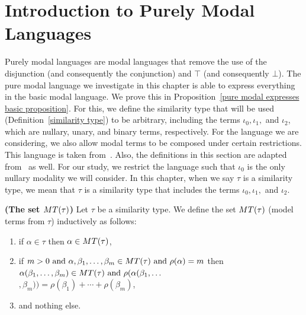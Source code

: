 \section{Introduction to Purely Modal Languages}\label{pure modal languages section}

\par Purely modal languages are modal languages that remove the use of the disjunction (and consequently the conjunction) and $\top$ (and consequently $\bot$). The pure modal language we investigate in this chapter is able to express everything in the basic modal language. We prove this in Proposition~\ref{pure modal expresses basic proposition}. 
For this, we define the similarity type that will be used (Definition~\ref{similarity type}) to be arbitrary, including the terms $\iota_0, \iota_1,$ and $\iota_2$, which are nullary, unary, and binary terms, respectively. For the language we are considering, we also allow modal terms to be composed under certain restrictions. This language is taken from~\cite{goranko2006elementary}. Also, the definitions in this section are adapted from~\cite{goranko2006elementary} as well. For our study, we restrict the language such that $\iota_0$ is the only nullary modality we will consider. In this chapter, when we say $\tau$ is a similarity type, we mean that $\tau$ is a similarity type that includes the terms $\iota_0, \iota_1,$ and $\iota_2$.



\begin{definition}

    \textbf{(The set $MT(\tau)$)} Let $\tau$ be a similarity type. We define the set $MT(\tau)$ (model terms from $\tau$) inductively as follows:

    \begin{enumerate}[label=(\roman*)]

        \item if $\alpha \in \tau$ then $\alpha\in MT(\tau)$,

        \item if $m > 0 \text{ and } \alpha, \beta_1, \ldots, \beta_m \in MT(\tau) \text{ and } \rho(\alpha) = m$ then $\alpha(\beta_1,\ldots,\beta_m) \in MT(\tau) \text{ and } \rho(\alpha(\beta_1,\ldots$\\
        $,\beta_m)) = \rho(\beta_1) + \cdots + \rho(\beta_m)$,

        \item and nothing else.

    \end{enumerate}


\end{definition}

